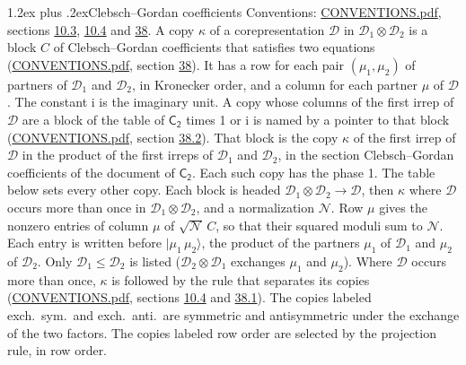 \documentclass[10pt,a4paper]{article}
\makeatletter
\renewcommand\section{\@startsection{section}{1}{\z@}{-3ex plus -1ex minus -.2ex}%
  {1.2ex plus .2ex}{\normalfont\large\sffamily\bfseries\color{parttitle}}}
\numberwithin{equation}{section}
\newcommand{\grp}[1]{\mathsf{#1}}
\newcommand{\iunit}{\mathrm{i}}
\newcommand{\irrprod}{\otimes}
\newcommand{\mult}{\kappa}
\newcommand{\intx}{\mu}
\newcommand{\cgnorm}{\mathcal{N}}
\newcommand{\prodket}[2]{\lvert {#1}\,{#2}\rangle}
\makeatother
\begin{document}
\section{Clebsch--Gordan coefficients}\label{s:clebsch_gordan}
Conventions: \href{../../CONVENTIONS.pdf}{CONVENTIONS.pdf}, sections \href{../../../rotation/CONVENTIONS.pdf\#conv.10.3}{10.3}, \href{../../../rotation/CONVENTIONS.pdf\#conv.10.4}{10.4} and \href{../../CONVENTIONS.pdf\#conv.38}{38}.
\leavevmode\label{n:index.copy}\label{n:matrix.cg.stored}A copy $\mult$ of a corepresentation $\mathcal{D}$ in $\mathcal{D}_1\irrprod\mathcal{D}_2$ is a block $C$ of Clebsch--Gordan coefficients that satisfies two equations (\href{../../CONVENTIONS.pdf}{CONVENTIONS.pdf}, section \href{../../CONVENTIONS.pdf\#conv.38}{38}). \label{n:index.cg}It has a row for each pair $(\intx_1, \intx_2)$ of partners of $\mathcal{D}_1$ and $\mathcal{D}_2$, in Kronecker order, and a column for each partner $\intx$ of $\mathcal{D}$.
The constant $\iunit$ is the imaginary unit.
A copy whose columns of the first irrep of $\mathcal{D}$ are a block of the table of $\grp{C_{2}}$ times 1 or $\iunit$ is named by a pointer to that block (\href{../../CONVENTIONS.pdf}{CONVENTIONS.pdf}, section \href{../../CONVENTIONS.pdf\#conv.38.2}{38.2}). That block is the copy $\mult$ of the first irrep of $\mathcal{D}$ in the product of the first irreps of $\mathcal{D}_1$ and $\mathcal{D}_2$, in the section Clebsch--Gordan coefficients of the document of \href{../../../rotation/data/pdf/C2.pdf}{$\grp{C_{2}}$}. Each such copy has the phase 1. The table below sets every other copy.
Each block is headed $\mathcal{D}_1\irrprod\mathcal{D}_2\to\mathcal{D}$, then $\mult$ where $\mathcal{D}$ occurs more than once in $\mathcal{D}_1\irrprod\mathcal{D}_2$, and a normalization $\cgnorm$. Row $\intx$ gives the nonzero entries of column $\intx$ of $\sqrt{\cgnorm}\,C$, so that their squared moduli sum to $\cgnorm$. \label{n:vector.ket.product}Each entry is written before $\prodket{\intx_1}{\intx_2}$, the product of the partners $\intx_1$ of $\mathcal{D}_1$ and $\intx_2$ of $\mathcal{D}_2$. Only $\mathcal{D}_1 \le \mathcal{D}_2$ is listed ($\mathcal{D}_2\irrprod\mathcal{D}_1$ exchanges $\intx_1$ and $\intx_2$).
Where $\mathcal{D}$ occurs more than once, $\mult$ is followed by the rule that separates its copies (\href{../../CONVENTIONS.pdf}{CONVENTIONS.pdf}, sections \href{../../../rotation/CONVENTIONS.pdf\#conv.10.4}{10.4} and \href{../../CONVENTIONS.pdf\#conv.38.1}{38.1}). \label{n:abbreviation.exchange}The copies labeled exch.\ sym.\ and exch.\ anti.\ are symmetric and antisymmetric under the exchange of the two factors. The copies labeled row order are selected by the projection rule, in row order.
\end{document}
